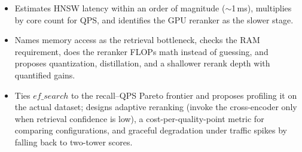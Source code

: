 \begin{interviewq}
\goodgreat
\begin{itemize}
    \item {} Estimates HNSW latency within an order of magnitude ($\sim$1\,ms), multiplies by core count for QPS, and identifies the GPU reranker as the slower stage.
    \item {} Names memory access as the retrieval bottleneck, checks the RAM requirement, does the reranker FLOPs math instead of guessing, and proposes quantization, distillation, and a shallower rerank depth with quantified gains.
    \item {} Ties $ef\_search$ to the recall--QPS Pareto frontier and proposes profiling it on the actual dataset; designs adaptive reranking (invoke the cross-encoder only when retrieval confidence is low), a cost-per-quality-point metric for comparing configurations, and graceful degradation under traffic spikes by falling back to two-tower scores.
\end{itemize}

\end{interviewq}